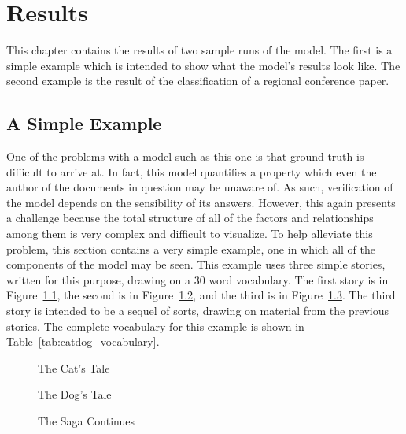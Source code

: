 \documentclass[../ut-dissertation.tex]{subfiles}
\begin{document}
\chapter{Results}
This chapter contains the results of two sample runs of the model.
The first is a simple example which is intended to show what the
model's results look like.  The second example is the result of the
classification of a regional conference paper.

\section{A Simple Example}
One of the problems with a model such as this one is that ground truth
is difficult to arrive at.  In fact, this model quantifies a property
which even the author of the documents in question may be unaware of.
As such, verification of the model depends on the sensibility of its
answers.  However, this again presents a challenge because the total
structure of all of the factors and relationships among them is
very complex and difficult to visualize.  To help alleviate this
problem, this section contains a very simple example, one in which all
of the components of the model may be seen.  This example uses three
simple stories, written for this purpose, drawing on a 30 word
vocabulary.  The first story is in Figure~\ref{fig:cat_story}, the
second is in Figure~\ref{fig:dog_story}, and the third is in
Figure~\ref{fig:cat_dog_story}.  The third story is intended to be a
sequel of sorts, drawing on material from the previous stories.  The
complete vocabulary for this example is shown in
Table~\ref{tab:catdog_vocabulary}.
\begin{figure}[p]
  \noindent{}
  \caption{The Cat's Tale}\label{fig:cat_story}
\end{figure}

\begin{figure}[p]
  \noindent{}
  \caption{The Dog's Tale}\label{fig:dog_story}
\end{figure}

\begin{figure}[p]
  \noindent{}
  \caption{The Saga Continues}\label{fig:cat_dog_story}
\end{figure}
\end{document}
